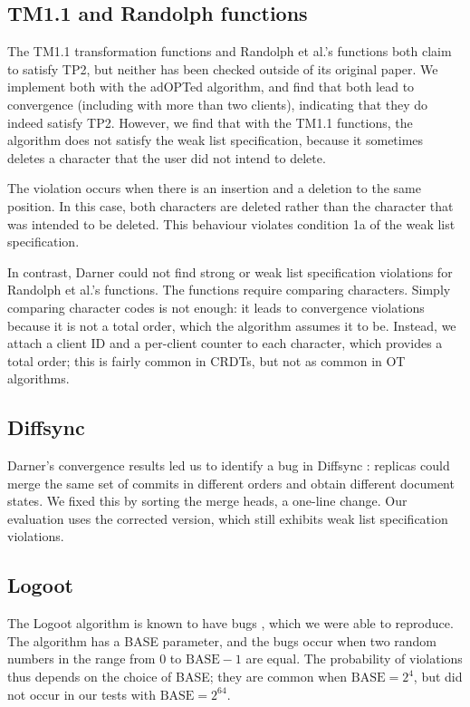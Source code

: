 \documentclass[sigplan,10pt,review,anonymous]{acmart}
\begin{document}
\subsection{TM1.1 and Randolph functions} \label{sec:tm11andrandolphfunctions}

The TM1.1 transformation functions \cite{Sun2017} and Randolph et al.'s functions \cite{Randolph2015} both claim to satisfy TP2, but neither has been checked outside of its original paper. We implement both with the adOPTed algorithm, and find that both lead to convergence (including with more than two clients), indicating that they do indeed satisfy TP2. However, we find that with the TM1.1 functions, the algorithm does not satisfy the weak list specification, because it sometimes deletes a character that the user did not intend to delete.

The violation occurs when there is an insertion and a deletion to the same position. In this case, both characters are deleted rather than the character that was intended to be deleted. This behaviour violates condition 1a of the weak list specification.

In contrast, Darner could not find strong or weak list specification violations for Randolph et al.'s functions. The functions require comparing characters. Simply comparing character codes is not enough: it leads to convergence violations because it is not a total order, which the algorithm assumes it to be. Instead, we attach a client ID and a per-client counter to each character, which provides a total order; this is fairly common in CRDTs, but not as common in OT algorithms.

\subsection{Diffsync}

Darner's convergence results led us to identify a bug in Diffsync \cite{Little2017}: replicas could merge the same set of commits in different orders and obtain different document states. We fixed this by sorting the merge heads, a one-line change. Our evaluation uses the corrected version, which still exhibits weak list specification violations.

\subsection{Logoot}

The Logoot \cite{Weiss2009} algorithm is known to have bugs \cite{Sun2018}, which we were able to reproduce.
The algorithm has a BASE parameter, and the bugs occur when two random numbers in the range from 0 to $\textrm{BASE} - 1$ are equal.
The probability of violations thus depends on the choice of BASE; they are common when $\mathrm{BASE} = 2^4$, but did not occur in our tests with $\mathrm{BASE} = 2^{64}$.
\end{document}
